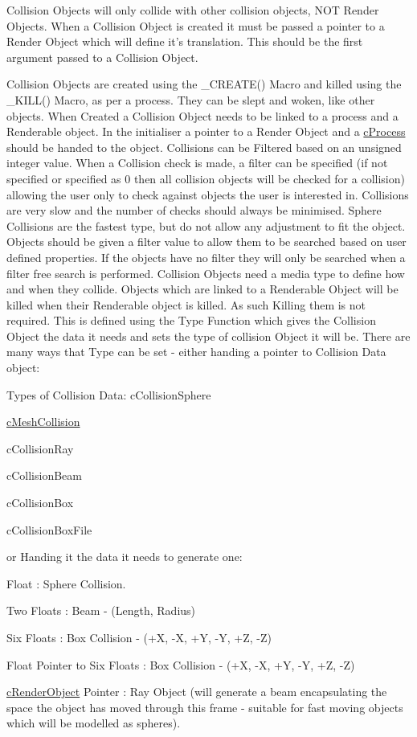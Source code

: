 Collision Objects will only collide with other collision objects, NOT Render Objects. When a Collision Object is created it must be passed a pointer to a Render Object which will define it's translation. This should be the first argument passed to a Collision Object.

Collision Objects are created using the \_\-CREATE() Macro and killed using the \_\-KILL() Macro, as per a process. They can be slept and woken, like other objects. When Created a Collision Object needs to be linked to a process and a Renderable object. In the initialiser a pointer to a Render Object and a \hyperlink{classc_process}{cProcess} should be handed to the object. Collisions can be Filtered based on an unsigned integer value. When a Collision check is made, a filter can be specified (if not specified or specified as 0 then all collision objects will be checked for a collision) allowing the user only to check against objects the user is interested in. Collisions are very slow and the number of checks should always be minimised. Sphere Collisions are the fastest type, but do not allow any adjustment to fit the object. Objects should be given a filter value to allow them to be searched based on user defined properties. If the objects have no filter they will only be searched when a filter free search is performed. Collision Objects need a media type to define how and when they collide. Objects which are linked to a Renderable Object will be killed when their Renderable object is killed. As such Killing them is not required. This is defined using the Type Function which gives the Collision Object the data it needs and sets the type of collision Object it will be. There are many ways that Type can be set -\/ either handing a pointer to Collision Data object: \par
 \par
 Types of Collision Data: cCollisionSphere\par
 \hyperlink{classc_mesh_collision}{cMeshCollision}\par
 cCollisionRay\par
 cCollisionBeam\par
 cCollisionBox\par
 cCollisionBoxFile\par
 \par
 or Handing it the data it needs to generate one:\par
 Float : Sphere Collision.\par
 Two Floats : Beam -\/ (Length, Radius) \par
 Six Floats : Box Collision -\/ (+X, -\/X, +Y, -\/Y, +Z, -\/Z) \par
 Float Pointer to Six Floats : Box Collision -\/ (+X, -\/X, +Y, -\/Y, +Z, -\/Z) \par
 \hyperlink{classc_render_object}{cRenderObject} Pointer : Ray Object (will generate a beam encapsulating the space the object has moved through this frame -\/ suitable for fast moving objects which will be modelled as spheres). \par



